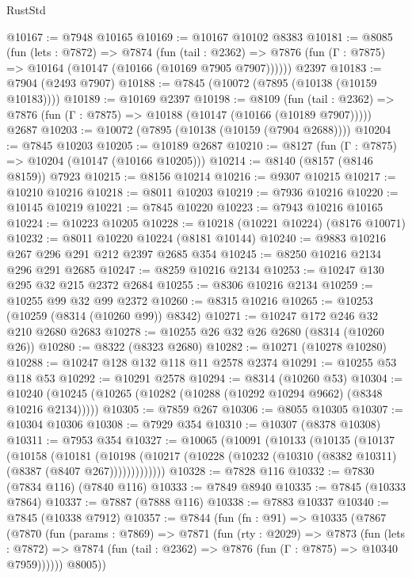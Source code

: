 \begin{lexlean}{RustStd}
\begin{coremodule}
@10167 := @7948 @10165
@10169 := @10167 @10102 @8383
@10181 := @8085
    (fun (lets : @7872) =>
    @7874
      (fun (tail : @2362) =>
      @7876 (fun (Γ : @7875) => @10164 (@10147 (@10166 (@10169 @7905 @7907))))))
    @2397
@10183 := @7904 (@2493 @7907)
@10188 := @7845 (@10072 (@7895 (@10138 (@10159 @10183))))
@10189 := @10169 @2397
@10198 := @8109
    (fun (tail : @2362) => @7876 (fun (Γ : @7875) => @10188 (@10147 (@10166 (@10189 @7907)))))
    @2687
@10203 := @10072 (@7895 (@10138 (@10159 (@7904 @2688))))
@10204 := @7845 @10203
@10205 := @10189 @2687
@10210 := @8127 (fun (Γ : @7875) => @10204 (@10147 (@10166 @10205)))
@10214 := @8140 (@8157 (@8146 @8159)) @7923
@10215 := @8156 @10214
@10216 := @9307 @10215
@10217 := @10210 @10216
@10218 := @8011 @10203
@10219 := @7936 @10216
@10220 := @10145 @10219
@10221 := @7845 @10220
@10223 := @7943 @10216 @10165
@10224 := @10223 @10205
@10228 := @10218 (@10221 @10224) (@8176 @10071)
@10232 := @8011 @10220 @10224 (@8181 @10144)
@10240 := @9883 @10216 @267 @296 @291 @212 @2397 @2685 @354
@10245 := @8250 @10216 @2134 @296 @291 @2685
@10247 := @8259 @10216 @2134
@10253 := @10247 @130 @295 @32 @215 @2372 @2684
@10255 := @8306 @10216 @2134
@10259 := @10255 @99 @32 @99 @2372
@10260 := @8315 @10216
@10265 := @10253 (@10259 (@8314 (@10260 @99)) @8342)
@10271 := @10247 @172 @246 @32 @210 @2680 @2683
@10278 := @10255 @26 @32 @26 @2680 (@8314 (@10260 @26))
@10280 := @8322 (@8323 @2680)
@10282 := @10271 (@10278 @10280)
@10288 := @10247 @128 @132 @118 @11 @2578 @2374
@10291 := @10255 @53 @118 @53
@10292 := @10291 @2578
@10294 := @8314 (@10260 @53)
@10304 := @10240 (@10245 (@10265 (@10282 (@10288 (@10292 @10294 @9662) (@8348 @10216 @2134)))))
@10305 := @7859 @267
@10306 := @8055 @10305
@10307 := @10304 @10306
@10308 := @7929 @354
@10310 := @10307 (@8378 @10308)
@10311 := @7953 @354
@10327 := @10065
    (@10091
      (@10133
        (@10135
          (@10137
            (@10158
              (@10181
                (@10198
                  (@10217 (@10228 (@10232 (@10310 (@8382 @10311) (@8387 (@8407 @267)))))))))))))
@10328 := @7828 @116
@10332 := @7830 (@7834 @116) (@7840 @116)
@10333 := @7849 @8940
@10335 := @7845 (@10333 @7864)
@10337 := @7887 (@7888 @116)
@10338 := @7883 @10337
@10340 := @7845 (@10338 @7912)
@10357 := @7844
    (fun (fn : @91) =>
    @10335
      (@7867
        (@7870
          (fun (params : @7869) =>
          @7871
            (fun (rty : @2029) =>
            @7873
              (fun (lets : @7872) =>
              @7874 (fun (tail : @2362) => @7876 (fun (Γ : @7875) => @10340 @7959))))))
        @8005))

\end{coremodule}
\end{lexlean}
